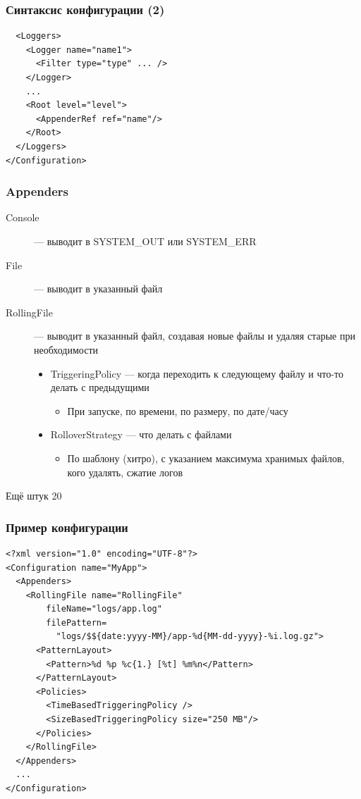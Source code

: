 \documentclass[xetex,mathserif,serif]{beamer}
\begin{document}
	\begin{frame}[fragile]
		\frametitle{Синтаксис конфигурации (2)}
		\begin{verbatim}
  <Loggers>
    <Logger name="name1">
      <Filter type="type" ... />
    </Logger>
    ...
    <Root level="level">
      <AppenderRef ref="name"/>
    </Root>
  </Loggers>
</Configuration>
		\end{verbatim}
\end{frame}

	\begin{frame}
		\frametitle{Appenders}
		\begin{description}
			\item [Console] --- выводит в SYSTEM\_OUT или SYSTEM\_ERR
			\item [File] --- выводит в указанный файл
			\item [RollingFile] --- выводит в указанный файл, создавая новые файлы и удаляя старые при необходимости
			\begin{itemize}
				\item TriggeringPolicy --- когда переходить к следующему файлу и что-то делать с предыдущими
				\begin{itemize}
					\item При запуске, по времени, по размеру, по дате/часу
				\end{itemize}
				\item RolloverStrategy --- что делать с файлами
				\begin{itemize}
					\item По шаблону (хитро), с указанием максимума хранимых файлов, кого удалять, сжатие логов
				\end{itemize}
			\end{itemize}
			\item [Ещё штук 20]
		\end{description}
	\end{frame}

	\begin{frame}[fragile]
		\frametitle{Пример конфигурации}
		\begin{footnotesize}
			\begin{verbatim}
<?xml version="1.0" encoding="UTF-8"?>
<Configuration name="MyApp">
  <Appenders>
    <RollingFile name="RollingFile" 
        fileName="logs/app.log"
        filePattern=
          "logs/$${date:yyyy-MM}/app-%d{MM-dd-yyyy}-%i.log.gz">
      <PatternLayout>
        <Pattern>%d %p %c{1.} [%t] %m%n</Pattern>
      </PatternLayout>
      <Policies>
        <TimeBasedTriggeringPolicy />
        <SizeBasedTriggeringPolicy size="250 MB"/>
      </Policies>
    </RollingFile>
  </Appenders>
  ...
</Configuration>
			\end{verbatim}
		\end{footnotesize}
\end{frame}
\end{document}
